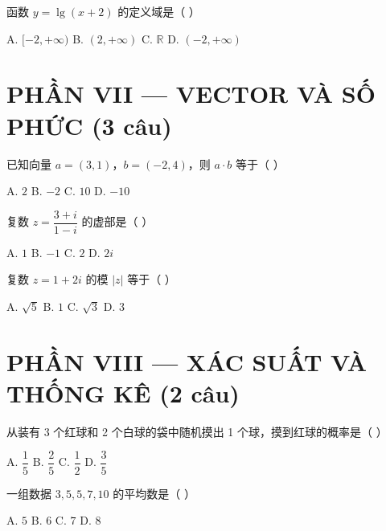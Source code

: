 \documentclass[11pt, a4paper]{article}
\begin{document}
\begin{baitap}[40]
函数 $y = \lg(x + 2)$ 的定义域是（ ）
\par\vspace{3pt}
\noindent A. $[-2, +\infty)$ \quad B. $(2, +\infty)$ \quad C. $\mathbb{R}$ \quad D. $(-2, +\infty)$
\end{baitap}

\section{PHẦN VII — VECTOR VÀ SỐ PHỨC (3 câu)}

\begin{baitap}[41]
已知向量 $a = (3, 1)$，$b = (-2, 4)$，则 $a \cdot b$ 等于（ ）
\par\vspace{3pt}
\noindent A. $2$ \quad B. $-2$ \quad C. $10$ \quad D. $-10$
\end{baitap}

\begin{baitap}[42]
复数 $z = \dfrac{3 + i}{1 - i}$ 的虚部是（ ）
\par\vspace{3pt}
\noindent A. $1$ \quad B. $-1$ \quad C. $2$ \quad D. $2i$
\end{baitap}

\begin{baitap}[43]
复数 $z = 1 + 2i$ 的模 $\lvert z \rvert$ 等于（ ）
\par\vspace{3pt}
\noindent A. $\sqrt{5}$ \quad B. $1$ \quad C. $\sqrt{3}$ \quad D. $3$
\end{baitap}

\section{PHẦN VIII — XÁC SUẤT VÀ THỐNG KÊ (2 câu)}

\begin{baitap}[44]
从装有 3 个红球和 2 个白球的袋中随机摸出 1 个球，摸到红球的概率是（ ）
\par\vspace{3pt}
\noindent A. $\dfrac{1}{5}$ \quad B. $\dfrac{2}{5}$ \quad C. $\dfrac{1}{2}$ \quad D. $\dfrac{3}{5}$
\end{baitap}

\begin{baitap}[45]
一组数据 $3, 5, 5, 7, 10$ 的平均数是（ ）
\par\vspace{3pt}
\noindent A. $5$ \quad B. $6$ \quad C. $7$ \quad D. $8$
\end{baitap}
\end{document}
